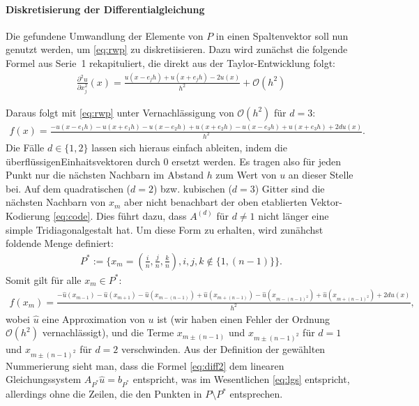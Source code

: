\documentclass[smallheadings]{scrartcl}
\begin{document}
\paragraph{Diskretisierung der Differentialgleichung}
Die gefundene Umwandlung der Elemente von $P$ in einen Spaltenvektor soll nun genutzt werden, um \eqref{eq:rwp} zu diskretiisieren. Dazu wird zunächst die folgende Formel aus Serie~1 rekapituliert, die direkt aus der Taylor-Entwicklung folgt: 
\begin{align}
\frac{\partial^2 u}{\partial x_j^2}(x)=\frac{u(x-e_jh)+u(x+e_jh)-2u(x)}{h^2}+\mathcal{O}(h^2)
\label{eq:diff}
\end{align} 

Daraus folgt mit \eqref{eq:rwp} unter Vernachlässigung von $\mathcal{O}(h^2)$ für $d=3$:
\begin{align}
f(x) = \frac{-u(x-e_1h)-u(x+e_1h)-u(x-e_2h)+u(x+e_2h)-u(x-e_3h)+u(x+e_3h)+2du(x)}{h^2}.
\end{align}
Die Fälle $d\in\{1,2\}$ lassen sich hieraus einfach ableiten, indem die \glqq überflüssigen\grqq Einhaitsvektoren durch $0$ ersetzt werden.
Es tragen also für jeden Punkt nur die nächsten Nachbarn im Abstand $h$ zum Wert von $u$ an dieser Stelle bei. Auf dem quadratischen ($d=2$) bzw. kubischen ($d=3$) Gitter sind die nächsten Nachbarn von $x_m$ aber nicht benachbart der oben etablierten Vektor-Kodierung \eqref{eq:code}. Dies führt dazu, dass $A^{(d)}$ für $d\neq 1$ nicht länger eine simple Tridiagonalgestalt hat. Um diese Form zu erhalten, wird zunähchst foldende Menge definiert:
\begin{align}
P^*:=\lbrace x_m=(\frac{i}{n}, \frac{j}{n}, \frac{k}{n}), i, j, k \notin \lbrace 1, (n-1)\rbrace\rbrace.
\end{align}
Somit gilt für alle $x_m\in P^*$:
\begin{align}
f(x_m) = \frac{-\hat{u}(x_{m-1})-\hat{u}(x_{m+1})-\hat{u}(x_{m-(n-1)})+\hat{u}(x_{m+(n-1)})-\hat{u}(x_{m-(n-1)^2})+\hat{u}(x_{m+(n-1)^2})+2d\hat{u}(x)}{h^2},
\label{eq:diff2}
\end{align}
wobei $\hat{u}$ eine Approximation von $u$ ist (wir haben einen Fehler der Ordnung $\mathcal{O}(h^2)$ vernachlässigt), und die Terme $x_{m\pm(n-1)}$ und $x_{m\pm(n-1)^2}$ für $d=1$ und $x_{m\pm(n-1)^2}$ für $d=2$	verschwinden. Aus der Definition der gewählten Nummerierung sieht man, dass die Formel \eqref{eq:diff2} dem linearen Gleichungssystem $A_{P^*}\hat{u}=b_{P^*}$ entspricht, was im Wesentlichen \eqref{eq:lgs} entspricht, allerdings ohne die Zeilen, die den Punkten in $P\setminus P^*$ entsprechen.
\end{document}
